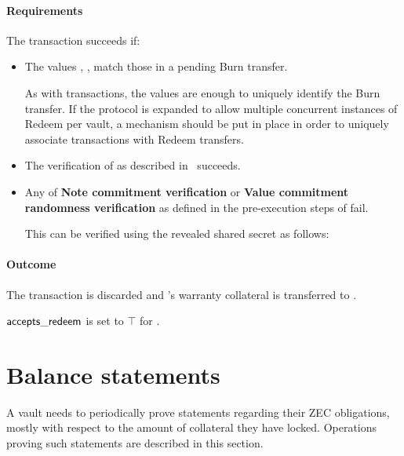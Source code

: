 \paragraph{Requirements}
The \challengeRedeem transaction succeeds if:
\begin{itemize}
    \item The values \dvf, \pkd, \epk match those in a pending Burn transfer.
    
    As with \challengeIssue transactions, the values \dpa are enough to uniquely identify the Burn transfer.
    If the protocol is expanded to allow multiple concurrent instances of Redeem per vault, a mechanism should be put in place in order to uniquely associate \challengeRedeem transactions with Redeem transfers.
    
    \item The verification of \pic as described in~\cite[Appendix B.2]{hopwood2016zcash} succeeds.
    \item Any of \textbf{Note commitment verification} or \textbf{Value commitment randomness verification} as defined in the pre-execution steps of \releaseop fail.
    
    This can be verified using the revealed shared secret as follows:
\end{itemize}

\paragraph{Outcome}
The \burn transaction is discarded and \redeemer's warranty collateral \iw is transferred to \vault.

$\mathsf{accepts\_redeem}$ is set to $\top$ for \vault.


\section{Balance statements}
\label{sec:balance_statements}
A vault \vault needs to periodically prove statements regarding their ZEC obligations, mostly with respect to the amount of collateral they have locked.
Operations proving such statements are described in this section. 

